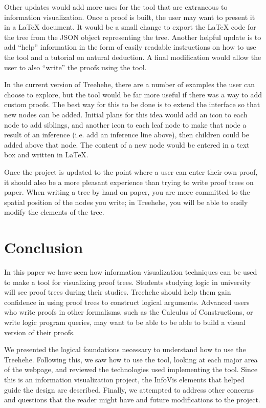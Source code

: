 \documentclass[conference]{IEEEtran}
\newcommand{\projectname}{Treehehe}
\begin{document}
Other updates would add more uses for the tool that are extraneous to information visualization. Once a proof is built, the user may want to present it in a \LaTeX{} document. It would be a small change to export the \LaTeX{} code for the tree from the JSON object representing the tree. Another helpful update is to add ``help'' information in the form of easily readable instructions on how to use the tool and a tutorial on natural deduction. A final modification would allow the user to also ``write'' the proofs using the tool.

In the current version of \projectname{}, there are a number of examples the user can choose to explore, but the tool would be far more useful if there was a way to add custom proofs. The best way for this to be done is to extend the interface so that new nodes can be added. Initial plans for this idea would add an icon to each node to add siblings, and another icon to each leaf node to make that node a result of an inference (i.e. add an inference line above), then children could be added above that node. The content of a new node would be entered in a text box and written in \LaTeX{}.%

Once the project is updated to the point where a user can enter their own proof, it should also be a more pleasant experience than trying to write proof trees on paper. When writing a tree by hand on paper, you are more committed to the spatial position of the nodes you write; in \projectname{}, you will be able to easily modify the elements of the tree.

\section{Conclusion}
\label{sec:conclusion}


In this paper we have seen how information visualization techniques can be used to make a tool for visualizing proof trees. Students studying logic in university will see proof trees during their studies. \projectname{} should help them gain confidence in using proof trees to construct logical arguments. Advanced users who write proofs in other formalisms, such as the Calculus of Constructions, or write logic program queries, may want to be able to be able to build a visual version of their proofs.

We presented the logical foundations necessary to understand how to use the \projectname{}. Following this, we saw how to use the tool, looking at each major area of the webpage, and reviewed the technologies used implementing the tool. Since this is an information visualization project, the InfoVis elements that helped guide the design are described. Finally, we attempted to address other concerns and questions that the reader might have and future modifications to the project.
\end{document}
